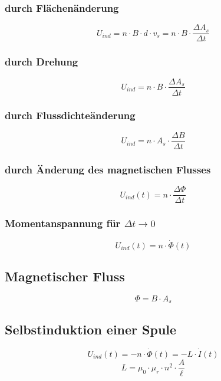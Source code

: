 \subsubsection{durch Flächenänderung}
\begin{equation}\label{eq:magnetische:induktion:flaechenaenderung}
U_{ind} = n \cdot B \cdot d \cdot v_s = n \cdot B \cdot \frac{\Delta A_s}{\Delta t}
\end{equation}

\subsubsection{durch Drehung}
\begin{equation}\label{eq:magnetische:induktion:drehung}
U_{ind} = n \cdot B \cdot \frac{\Delta A_s}{\Delta t}
\end{equation}

\subsubsection{durch Flussdichteänderung}
\begin{equation}\label{eq:magnetische:induktion:flussdichteaenderung}
U_{ind} = n \cdot A_s \cdot \frac{\Delta B}{\Delta t}
\end{equation}
  
\subsubsection{durch Änderung des magnetischen Flusses}
\begin{equation}\label{eq:magnetische:induktion:flussaenderung}
U_{ind}(t) = n \cdot \frac{\Delta \Phi}{\Delta t}
\end{equation}

\subsubsection{Momentanspannung für $\Delta t \to 0$}
\begin{equation}\label{eq:magnetische:induktion:momentanspannung}
U_{ind}(t) = n \cdot \dot{\Phi}(t)
\end{equation}

\subsection{Magnetischer Fluss}
\begin{equation}\label{eq:magnetischer:fluss}
\Phi = B \cdot A_s
\end{equation}

\subsection{Selbstinduktion einer Spule}
\begin{equation}\label{eq:spule:selbstinduktion}
U_{ind}(t) = - n \cdot \dot{\Phi}(t) = - L \cdot \dot{I}(t)
\end{equation}
\begin{equation}\label{eq:spule:induktivitaet}
L = \mu_0\cdot
\mu_r \cdot n^2 \cdot \frac{A}{\ell}
\end{equation}